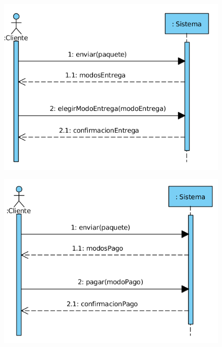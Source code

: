 \begin{figure}[H]
	\centering
	\includegraphics[width=16cm]{41}
\end{figure}
\begin{figure}[H]
	\centering
	\includegraphics[width=16cm]{42}
\end{figure}
